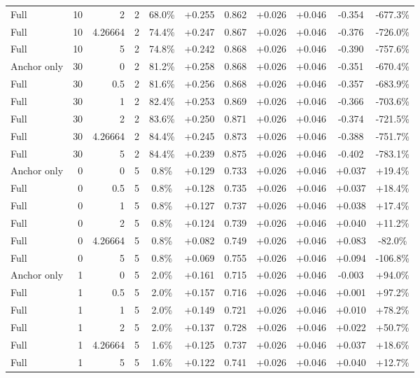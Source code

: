 \begin{table}[htbp]
\begin{tabular}{lrrrccccccc}
Full & 10 & 2 & 2 & 68.0\% & +0.255 & 0.862 & +0.026 & +0.046 & -0.354 & -677.3\% \\
Full & 10 & 4.26664 & 2 & 74.4\% & +0.247 & 0.867 & +0.026 & +0.046 & -0.376 & -726.0\% \\
Full & 10 & 5 & 2 & 74.8\% & +0.242 & 0.868 & +0.026 & +0.046 & -0.390 & -757.6\% \\
Anchor only & 30 & 0 & 2 & 81.2\% & +0.258 & 0.868 & +0.026 & +0.046 & -0.351 & -670.4\% \\
Full & 30 & 0.5 & 2 & 81.6\% & +0.256 & 0.868 & +0.026 & +0.046 & -0.357 & -683.9\% \\
Full & 30 & 1 & 2 & 82.4\% & +0.253 & 0.869 & +0.026 & +0.046 & -0.366 & -703.6\% \\
Full & 30 & 2 & 2 & 83.6\% & +0.250 & 0.871 & +0.026 & +0.046 & -0.374 & -721.5\% \\
Full & 30 & 4.26664 & 2 & 84.4\% & +0.245 & 0.873 & +0.026 & +0.046 & -0.388 & -751.7\% \\
Full & 30 & 5 & 2 & 84.4\% & +0.239 & 0.875 & +0.026 & +0.046 & -0.402 & -783.1\% \\
Anchor only & 0 & 0 & 5 & 0.8\% & +0.129 & 0.733 & +0.026 & +0.046 & +0.037 & +19.4\% \\
Full & 0 & 0.5 & 5 & 0.8\% & +0.128 & 0.735 & +0.026 & +0.046 & +0.037 & +18.4\% \\
Full & 0 & 1 & 5 & 0.8\% & +0.127 & 0.737 & +0.026 & +0.046 & +0.038 & +17.4\% \\
Full & 0 & 2 & 5 & 0.8\% & +0.124 & 0.739 & +0.026 & +0.046 & +0.040 & +11.2\% \\
Full & 0 & 4.26664 & 5 & 0.8\% & +0.082 & 0.749 & +0.026 & +0.046 & +0.083 & -82.0\% \\
Full & 0 & 5 & 5 & 0.8\% & +0.069 & 0.755 & +0.026 & +0.046 & +0.094 & -106.8\% \\
Anchor only & 1 & 0 & 5 & 2.0\% & +0.161 & 0.715 & +0.026 & +0.046 & -0.003 & +94.0\% \\
Full & 1 & 0.5 & 5 & 2.0\% & +0.157 & 0.716 & +0.026 & +0.046 & +0.001 & +97.2\% \\
Full & 1 & 1 & 5 & 2.0\% & +0.149 & 0.721 & +0.026 & +0.046 & +0.010 & +78.2\% \\
Full & 1 & 2 & 5 & 2.0\% & +0.137 & 0.728 & +0.026 & +0.046 & +0.022 & +50.7\% \\
Full & 1 & 4.26664 & 5 & 1.6\% & +0.125 & 0.737 & +0.026 & +0.046 & +0.037 & +18.6\% \\
Full & 1 & 5 & 5 & 1.6\% & +0.122 & 0.741 & +0.026 & +0.046 & +0.040 & +12.7\% \\

\end{tabular}
\end{table}
